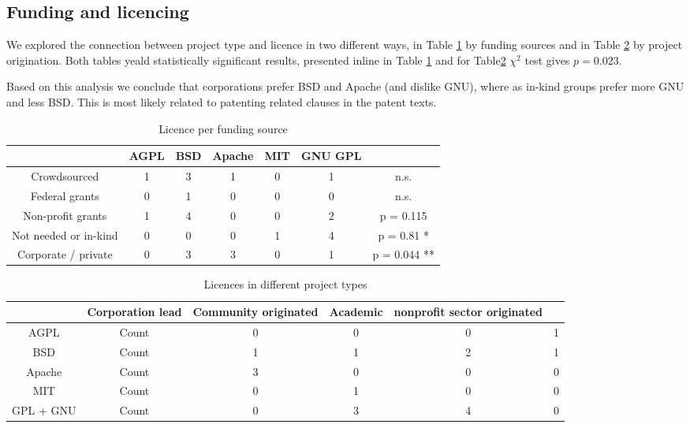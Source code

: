 \subsection{Funding and licencing}

We explored the connection between project type and licence in two different ways, in Table \ref{tab:licence_per_fudning} by funding sources and in Table \ref{tab:licence_per_project_type} by project origination. Both tables yeald statistically significant results, presented inline in Table \ref{tab:licence_per_fudning} and for Table\ref{tab:licence_per_project_type} $\chi^2$ test gives $p=0.023$.

Based on this analysis we conclude that corporations prefer BSD and Apache (and dislike GNU), where as in-kind groups prefer more GNU and less BSD. This is most likely related to patenting related clauses in the patent texts.

\begin{table}[htbp]
  \centering
  \caption{Licence per funding source}
    \begin{tabular}{|c|c|c|c|c|c|c|}
    \hline
          & AGPL  & BSD   & Apache & MIT   & GNU GPL &  \\
     \hline
    Crowdsourced & 1     & 3     & 1     & 0     & 1     & n.s. \\
    Federal grants & 0     & 1     & 0     & 0     & 0     & n.s. \\
    Non-profit grants & 1     & 4     & 0     & 0     & 2     & p = 0.115 \\
    Not needed or in-kind & 0     & 0     & 0     & 1     & 4     & p = 0.81 * \\
    Corporate / private & 0     & 3     & 3     & 0     & 1     & p = 0.044 ** \\
    \hline
    \end{tabular}
  \label{tab:licence_per_fudning}
\end{table}

\begin{table}[htbp]
  \centering
  \caption{Licences in different project types}
    \begin{tabular}{|c|c|c|c|c|c|}
    \hline
          & Corporation lead& Community originated & Academic  & nonprofit sector originated &  \\
    \hline
    AGPL  & Count & 0     & 0     & 0     & 1 \\
    BSD   & Count & 1     & 1     & 2     & 1 \\
    Apache & Count & 3     & 0     & 0     & 0 \\
    MIT   & Count & 0     & 1     & 0     & 0 \\
    GPL + GNU & Count & 0     & 3     & 4     & 0 \\
    \hline
    \end{tabular}
  \label{tab:licence_per_project_type}
\end{table}%